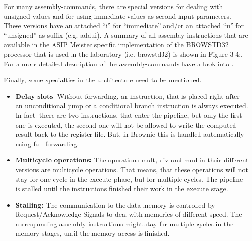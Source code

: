 For many assembly-commands, there are special versions for dealing with
unsigned values and for using immediate values as second input
parameters. These versions have an attached ``i'' for ``immediate''
and/or an attached ``u'' for ``unsigned'' as suffix (e.g. addui). A
summary of all assembly instructions that are available in the ASIP
Meister specific implementation of the BROWSTD32 processor that is used
in the laboratory (i.e. browstd32) is shown in Figure 3‑4:. For a more
detailed description of the assembly-commands have a look into \cite{Sailer96}.

Finally, some specialties in the architecture need to be mentioned:
\begin{itemize}
\item
  \textbf{Delay slots:} Without forwarding, an instruction, that is
  placed right after an unconditional jump or a conditional branch
  instruction is always executed. In fact, there are two instructions,
  that enter the pipeline, but only the first one is executed, the
  second one will not be allowed to write the computed result back to
  the register file. But, in Brownie this is handled automatically using
  full-forwarding.
\item
  \textbf{Multicycle operations:} The operations mult, div and mod in
  their different versions are multicycle operations. That means, that
  these operations will not stay for one cycle in the execute phase, but
  for multiple cycles. The pipeline is stalled until the instructions
  finished their work in the execute stage.
\item
  \textbf{Stalling:} The communication to the data memory is controlled
  by Request/Acknowledge-Signals to deal with memories of different
  speed. The corresponding assembly instructions might stay for multiple
  cycles in the memory stages, until the memory access is finished.
\begin{figure}[!htb]
	\centering

\end{figure}
\end{itemize}
